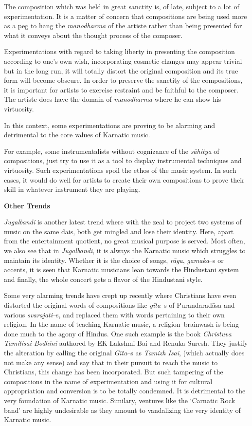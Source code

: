The composition which was held in great sanctity is, of late, subject to a lot of experimentation. It is a matter of concern that compositions are being used more as a peg to hang the \textit{manodharma} of the artiste rather than being presented for what it conveys about the thought process of the composer.

Experimentations with regard to taking liberty in presenting the composition according to one’s own wish, incorporating cosmetic changes may appear trivial but in the long run, it will totally distort the original composition and its true form will become obscure. In order to preserve the sanctity of the compositions, it is important for artists to exercise restraint and be faithful to the composer. The artiste does have the domain of \textit{manodharma} where he can show his virtuosity.

In this context, some experimentations are proving to be alarming and detrimental to the core values of Karnatic music.

For example, some instrumentalists without cognizance of the \textit{sāhitya} of compositions, just try to use it as a tool to display instrumental techniques and virtuosity. Such experimentations spoil the ethos of the music system. In such cases, it would do well for artists to create their own compositions to prove their skill in whatever instrument they are playing.

\textbf{Other Trends}

\textit{Jugalbandi} is another latest trend where with the zeal to project two systems of music on the same dais, both get mingled and lose their identity. Here, apart from the entertainment quotient, no great musical purpose is served. Most often, we also see that in \textit{Jugalbandi}, it is always the Karnatic music which struggles to maintain its identity. Whether it is the choice of songs, \textit{rāga}, \textit{gamaka}–s or accents, it is seen that Karnatic musicians lean towards the Hindustani system and finally, the whole concert gets a flavor of the Hindustani style.

Some very alarming trends have crept up recently where Christians have even distorted the original words of compositions like \textit{gīta}–s of Purandaradāsa and various \textit{svarajati}–s, and replaced them with words pertaining to their own religion. In the name of teaching Karnatic music, a religion–brainwash is being done much to the agony of Hindus. One such example is the book \textit{Christuva Tamilisai Bodhini} authored by EK Lakshmi Bai and Renuka Suresh. They justify the alteration by calling the original \textit{Gīta}–s as \textit{Tamizh Isai}, (which actually does not make any sense) and say that in their pursuit to reach the music to Christians, this change has been incorporated. But such tampering of the compositions in the name of experimentation and using it for cultural appropriation and conversion is to be totally condemned. It is detrimental to the very foundation of Karnatic music. Similary, ventures like the ‘Carnatic Rock band’ are highly undesirable as they amount to vandalizing the very identity of Karnatic music.

